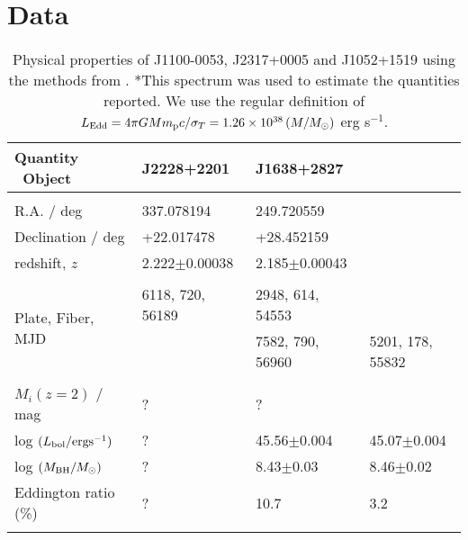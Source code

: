 \documentclass[a4paper,fleqn,usenatbib]{mnras}
\begin{document}
\section{Data}
\begin{table}
 \centering
 \begin{tabular}{l l l l}
  \hline \hline 
   Quantity \ Object                           & J2228+2201     &  J1638+2827 \\
 \hline 
    &&\\
    R.A. / deg                                        &    337.078194      &  249.720559\\
    Declination / deg                            &    +22.017478      &  +28.452159 \\
    redshift, $z$                                    &   2.222$\pm$0.00038   &  2.185$\pm$0.00043          \\
    &&\\ 
    \multirow{2}{*}{Plate, Fiber, MJD}   & 6118, 720, 56189	     &  2948, 614, 54553	  \\
    &                                                   & 7582, 790, 56960	     & 5201, 178, 55832 \\    
    &                                                   &                                         & \\
    $M_{i}(z=2)$  / mag                          &   ?                       & ?                \\
    log $(L_{\rm bol} / {\rm erg s}^{-1}) $  &   ?             & 45.56$\pm$0.004      & 45.07$\pm$0.004 \\
    log $(M_{\rm BH} / M_{\odot})  $           &  ?                  & 8.43$\pm$0.03           & 8.46$\pm$0.02 \\
    Eddington ratio  (\%)                        &  ?                               &  10.7                           &  3.2     \\ 
    &&\\
    \hline \hline 
  \end{tabular}
  \caption{Physical properties of J1100-0053, J2317+0005 and J1052+1519 using the
    methods from \citet{Shen2011}. *This spectrum was used to estimate
    the quantities reported.  We use the regular definition of $L_{\rm
      Edd} = 4 \pi G M m_{\rm p} c /\sigma_{T} =
    1.26\times10^{38}\left (M/M_{\odot} \right )$ erg s$^{-1}$.} 
 \label{tab:Shen_props}
\end{table}
\end{document}
